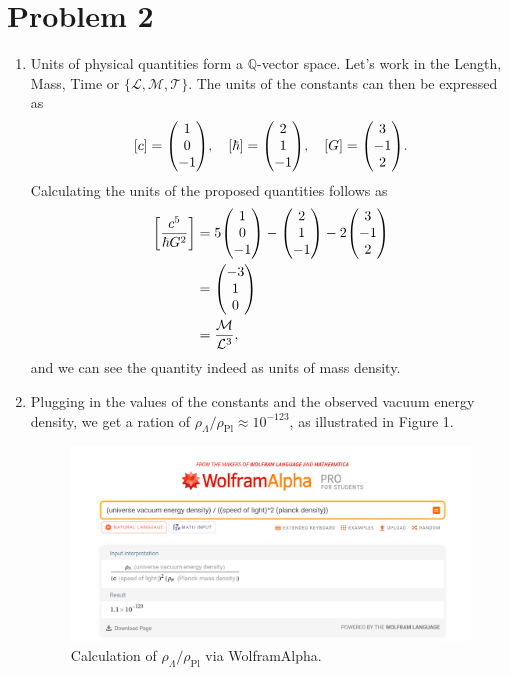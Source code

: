 \documentclass[12pt]{article}
\begin{document}
\section*{Problem 2}
\begin{enumerate}[label=(\alph*)]
    \item Units of physical quantities form a $\mathbb{Q}$-vector space. Let's work in the {Length, Mass, Time} or $\{\mathcal{L}, \mathcal{M}, \mathcal{T}\}$. The units of the constants can then be expressed as
    \[ [c] = \mqty(1\\0\\-1), \quad [\hbar] = \mqty(2\\1\\-1), \quad [G] = \mqty(3\\-1\\2). \]
    Calculating the units of the proposed quantities follows as
    \begin{align*}
        \left[\frac{c^5}{\hbar G^2}\right] &= 5\mqty(1\\0\\-1) - \mqty(2\\1\\-1) - 2\mqty(3\\-1\\2) \\
        &= \mqty(-3\\1\\0) \\
        &= \frac{\mathcal{M}}{\mathcal{L}^3},
    \end{align*}
    and we can see the quantity indeed as units of mass density.

    \item 
    Plugging in the values of the constants and the observed vacuum energy density, we get a ration of $\rho_\Lambda / \rho_\text{Pl} \approx 10^{-123}$, as illustrated in Figure 1.
    \begin{figure}[h]
        \includegraphics[scale=0.7]{2b.PNG}
        \centering
        \caption{Calculation of $\rho_\Lambda / \rho_\text{Pl}$ via WolframAlpha.}
        \label{fig1}
    \end{figure}


\end{enumerate}
\end{document}
